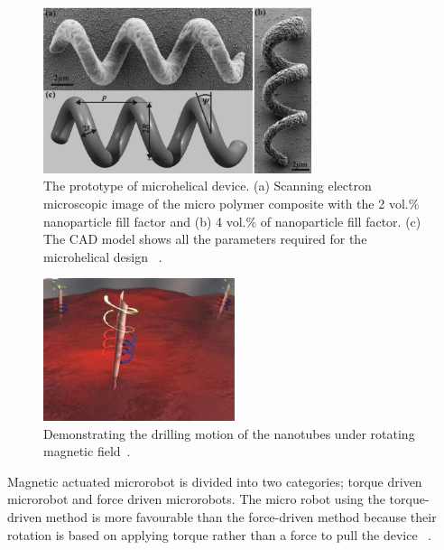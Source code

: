 \documentclass[12pt,a4paper,titlepage]{report}
\begin{document}
\begin{figure}
  \centering
    \includegraphics[width=0.7\textwidth]{8}
  \caption[The prototype of microhelical device]{ The prototype of microhelical device. (a) Scanning electron microscopic image of the micro polymer composite
with the 2 vol.\% nanoparticle fill factor and (b) 4 vol.\% of nanoparticle fill factor. (c) The CAD model
shows all the parameters required for the microhelical design ~\citep{peyer2013bacteria}.}
  \label{ref8}
\end{figure}






\begin{figure}
  \begin{center}
    \includegraphics[width=0.5\textwidth]{nanoJet3}
  \caption[Drilling motion of a nanotube]{Demonstrating the drilling motion of the nanotubes under rotating
 magnetic field~\citep{C2NR32798H}.}
  \label{nanotube}
\end{center}
\end{figure}



Magnetic actuated microrobot is divided into two categories; torque driven microrobot and force
 driven microrobots.
The micro robot using the torque-driven method is more favourable than the force-driven method 
because their rotation is based on applying torque rather than a force to pull the device ~\citep{peyer2013bacteria}.
\end{document}
